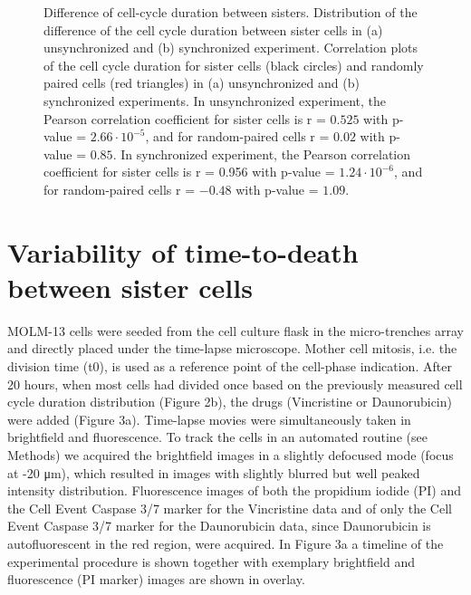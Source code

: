 \documentclass[pdftex,12pt,a4paper]{report}
\begin{document}
\begin{figure}[H]
\caption[Difference of cell-cycle duration between sisters]{Difference of cell-cycle duration between sisters. Distribution of the difference of the cell cycle duration between sister cells in (a) unsynchronized and (b) synchronized experiment. Correlation plots of the cell cycle duration for sister cells (black circles) and randomly paired cells (red  triangles) in (a) unsynchronized and (b) synchronized experiments. In unsynchronized experiment, the Pearson correlation coefficient for sister cells is r = $0.525$ with p-value = $2.66 \cdot 10^{-5}$, and for random-paired cells r = $0.02$ with p-value = $0.85$.  In synchronized experiment, the Pearson correlation coefficient for sister cells is r = 0.956 with p-value = $1.24 \cdot 10^{-6}$, and for random-paired cells r = $-0.48$ with p-value = $1.09$.}
\label{fig:ccd_diff_all}
\end{figure}

\section{Variability of time-to-death between sister cells}
\label{section:sisters_death_time}


MOLM-13 cells were seeded from the cell culture flask in the micro-trenches array and directly placed under the time-lapse microscope. Mother cell mitosis, i.e. the division time (t0), is used as a reference point of the cell-phase indication. After 20 hours, when most cells had divided once based on the previously measured cell cycle duration distribution (Figure 2b), the drugs (Vincristine or Daunorubicin) were added (Figure 3a). Time-lapse movies were simultaneously taken in brightfield and fluorescence. To track the cells in an automated routine (see Methods) we acquired the brightfield images in a slightly defocused mode (focus at -20 μm), which resulted in images with slightly blurred but well peaked intensity distribution. Fluorescence images of both the propidium iodide (PI) and the Cell Event Caspase 3/7 marker for the Vincristine data and of only the Cell Event Caspase 3/7 marker for the Daunorubicin data, since Daunorubicin is autofluorescent in the red region, were acquired. In Figure 3a a timeline of the experimental procedure is shown together with exemplary brightfield and fluorescence (PI marker) images are shown in overlay.
\end{document}
